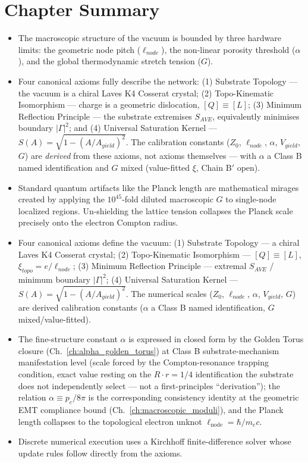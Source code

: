 \section*{Chapter Summary}
\begin{itemize}
    \item The macroscopic structure of the vacuum is bounded by three hardware limits: the geometric node pitch ($\ell_{node}$), the non-linear porosity threshold ($\alpha$), and the global thermodynamic stretch tension ($G$).
    \item Four canonical axioms fully describe the network: (1) Substrate Topology --- the vacuum is a chiral Laves K4 Cosserat crystal; (2) Topo-Kinematic Isomorphism --- charge is a geometric dislocation, $[Q] \equiv [L]$; (3) Minimum Reflection Principle --- the substrate extremises $S_{AVE}$, equivalently minimises boundary $|\Gamma|^2$; and (4) Universal Saturation Kernel --- $S(A) = \sqrt{1-(A/A_{yield})^2}$. The calibration constants ($Z_0$, $\ell_{node}$, $\alpha$, $V_{yield}$, $G$) are \emph{derived} from these axioms, not axioms themselves --- with $\alpha$ a Class B named identification and $G$ mixed (value-fitted $\xi$, Chain B$'$ open).
    \item Standard quantum artifacts like the Planck length are mathematical mirages created by applying the $10^{45}$-fold diluted macroscopic $G$ to single-node localized regions. Un-shielding the lattice tension collapses the Planck scale precisely onto the electron Compton radius.
\end{itemize}

\begin{summarybox}
\begin{itemize}
    \item Four canonical axioms define the vacuum: (1) Substrate Topology --- a chiral Laves K4 Cosserat crystal; (2) Topo-Kinematic Isomorphism --- $[Q] \equiv [L]$, $\xi_{topo} = e/\ell_{node}$; (3) Minimum Reflection Principle --- extremal $S_{AVE}$ / minimum boundary $|\Gamma|^2$; (4) Universal Saturation Kernel --- $S(A) = \sqrt{1-(A/A_{yield})^2}$. The numerical scales ($Z_0$, $\ell_{node}$, $\alpha$, $V_{yield}$, $G$) are derived calibration constants ($\alpha$ a Class B named identification, $G$ mixed/value-fitted).
    \item The fine-structure constant $\alpha$ is expressed in closed form by the Golden Torus closure (Ch.~\ref{ch:alpha_golden_torus}) at Class B substrate-mechanism manifestation level (scale forced by the Compton-resonance trapping condition, exact value resting on the $R \cdot r = 1/4$ identification the substrate does not independently select --- not a first-principles ``derivation''); the relation $\alpha \equiv p_c / 8\pi$ is the corresponding consistency identity at the geometric EMT compliance bound (Ch.~\ref{ch:macroscopic_moduli}), and the Planck length collapses to the topological electron unknot $\ell_{\text{node}} = \hbar / m_e c$.
    \item Discrete numerical execution uses a Kirchhoff finite-difference solver whose update rules follow directly from the axioms.
\end{itemize}
\end{summarybox}

